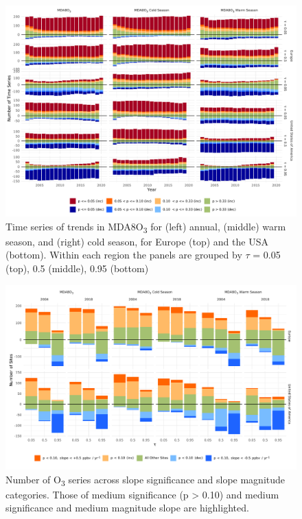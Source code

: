 \documentclass[journal abbreviation, manuscript]{copernicus}
\begin{document}

\begin{figure}[p]
\centering
\includegraphics[width=\textwidth]{figures/paper_figures/f03_signifcance_bars.pdf}
\caption{Time series of trends in MDA8O\textsubscript{3} for (left) annual, (middle) warm season, and (right) cold season, for Europe (top) and the USA (bottom). Within each region the panels are grouped by $\tau$ = 0.05 (top), 0.5 (middle), 0.95 (bottom)}
\label{fig:signifcance_bars}
\end{figure}
\clearpage

\begin{figure}[p]
\includegraphics[width=12cm]{figures/paper_figures/f04_slope_sig_counts.pdf}
\caption{Number of O\textsubscript{3} series across slope significance and slope magnitude categories. Those of medium significance (p > 0.10) and medium significance and medium magnitude slope are highlighted.}
\label{fig:slope_sig_counts}
\end{figure}
\clearpage
\end{document}
